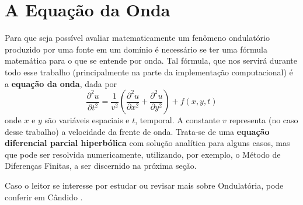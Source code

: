 \section{A Equação da Onda}

Para que seja possível avaliar matematicamente um fenômeno ondulatório
produzido por uma fonte em um domínio é necessário se ter uma fórmula
matemática para o que se entende por onda. Tal fórmula, que nos servirá
durante todo esse trabalho (principalmente na parte da implementação
computacional) é a \textbf{equação da onda}, dada por
\begin{equation}
	\label{eq:waveEq}
	\dfrac{\partial^2 u}{\partial t^2} =
	\dfrac{1}{v^2}
	\left(\dfrac{\partial^2 u}{\partial x^2} +
	\dfrac{\partial^2 u}{\partial y^2}\right) + f(x, y, t)
\end{equation}
onde $x$ e $y$ são variáveis espaciais e $t$, temporal. A constante $v$
representa (no caso desse trabalho) a velocidade da frente de onda. Trata-se de uma
\textbf{equação diferencial parcial hiperbólica} com solução analítica para alguns casos, mas
que pode ser resolvida numericamente, utilizando, por exemplo, o
Método de Diferenças Finitas, a ser discernido na próxima seção.

Caso o leitor se interesse por estudar ou revisar mais sobre Ondulatória, pode
conferir em Cândido \cite{mfcandido2018}.
